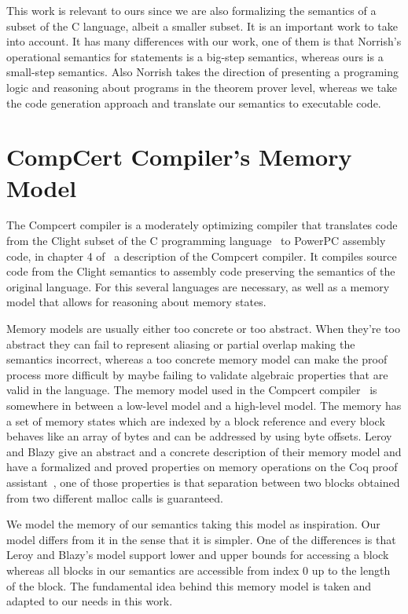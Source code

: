 This work is relevant to ours since we are also formalizing the semantics of a subset of the C language, albeit a smaller subset.
It is an important work to take into account.
It has many differences with our work, one of them is that Norrish's operational semantics for statements is a big-step semantics, whereas ours is a small-step semantics.
Also Norrish takes the direction of presenting a programing logic and reasoning about programs in the theorem prover level, whereas we take the code generation approach and translate our semantics to executable code.


\section{CompCert Compiler's Memory Model}

The Compcert compiler is a moderately optimizing compiler that translates code from the Clight subset of the C programming language~\parencite{clight} to PowerPC assembly code, in chapter 4 of~\parencite{compcert-float-point} a description of the Compcert compiler.
It compiles source code from the Clight semantics to assembly code preserving the semantics of the original language.
For this several languages are necessary, as well as a memory model that allows for reasoning about memory states.

Memory models are usually either too concrete or too abstract.
When they're too abstract they can fail to represent aliasing or partial overlap making the semantics incorrect, whereas a too concrete memory model can make the proof process more difficult by maybe failing to validate algebraic properties that are valid in the language.
The memory model used in the Compcert compiler~\parencite{leroy-blazy-memory-model} is somewhere in between a low-level model and a high-level model.
The memory has a set of memory states which are indexed by a block reference and every block behaves like an array of bytes and can be addressed by using byte offsets.
Leroy and Blazy give an abstract and a concrete description of their memory model and have a formalized and proved properties on memory operations on the Coq proof assistant~\parencite{coq-doc}, one of those properties is that separation between two blocks obtained from two different malloc calls is guaranteed.

We model the memory of our semantics taking this model as inspiration.
Our model differs from it in the sense that it is simpler.
One of the differences is that Leroy and Blazy's model support lower and upper bounds for accessing a block whereas all blocks in our semantics are accessible from index $0$ up to the length of the block.
The fundamental idea behind this memory model is taken and adapted to our needs in this work.


